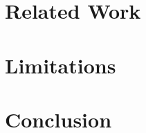 \documentclass[11pt]{article}
\begin{document}
\section{Related Work}

\section{Limitations}

\section{Conclusion}



\nocite{*}
\end{document}
